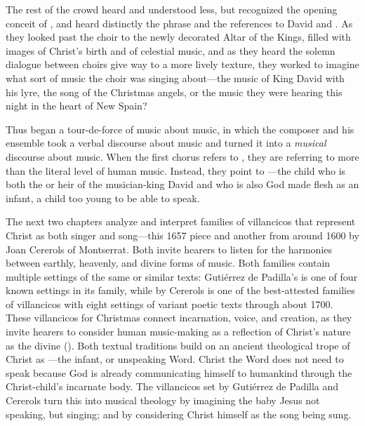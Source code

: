 The rest of the crowd heard and understood less, but recognized the opening
conceit of , and heard distinctly the phrase  and the references to David and .
As they looked past the choir to the newly decorated Altar of the Kings, filled
with images of Christ's birth and of celestial music, and as they heard the
solemn dialogue between choirs give way to a more lively texture, they worked
to imagine what sort of music the choir was singing about---the music of King
David with his lyre, the song of the Christmas angels, or the music they were
hearing this night in the heart of New Spain?

Thus began a tour-de-force of music about music, in which the composer and his
ensemble took a verbal discourse about music and turned it into a
\emph{musical} discourse about music.
When the first chorus refers to , they are referring to
more than the literal level of human music.
Instead, they point to ---the child who is both the
 or heir of the musician-king David and who is also God made
flesh as an infant, a child too young to be able to speak.

The next two chapters analyze and interpret families of villancicos that
represent Christ as both singer and song---this 1657 piece and another from
around 1600 by Joan Cererols of Montserrat.
Both invite hearers to listen for the harmonies between earthly, heavenly, and
divine forms of music.
Both families contain multiple settings of the same or similar texts: Gutiérrez
de Padilla's  is one of four known settings in
its family, while  by Cererols
is one of the best-attested families of villancicos with eight settings of
variant poetic texts through about 1700.
These villancicos for Christmas connect incarnation, voice, and creation, as
they invite hearers to consider human music-making as a reflection of
Christ's nature as the divine  ().
Both textual traditions build on an ancient theological trope of Christ as
---the infant, or unspeaking Word.
Christ the Word does not need to speak because God is already communicating
himself to humankind through the Christ-child's incarnate body.
The villancicos set by Gutiérrez de Padilla and Cererols turn this into musical
theology by imagining the baby Jesus not speaking, but singing; and by
considering Christ himself as the song being sung.

